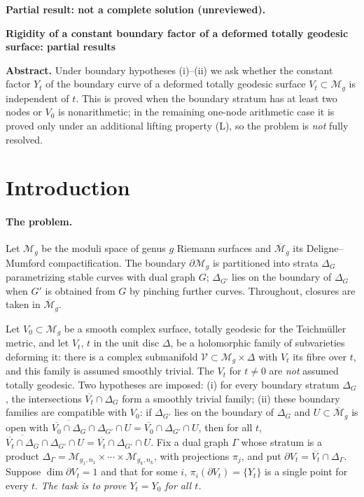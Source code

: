 \documentclass[12pt]{article}
\newcommand{\M}{\mathcal M}
\newcommand{\cl}[1]{\overline{#1}}
\theoremstyle{remark}
\begin{document}
\noindent\textbf{Partial result: not a complete solution (unreviewed).}\par

\begin{center}
\textbf{Rigidity of a constant boundary factor of a deformed
totally geodesic surface: partial results}
\end{center}

\noindent\textbf{Abstract.}
Under boundary hypotheses (i)--(ii) we ask whether the constant
factor \(Y_t\) of the boundary curve of a deformed totally geodesic
surface \(V_t\subset\M_g\) is independent of \(t\). This is proved
when the boundary stratum has at least two nodes or \(V_0\) is
nonarithmetic; in the remaining one-node arithmetic case
it is proved only under an additional lifting property (L), so the
problem is \emph{not} fully resolved.

\section{Introduction}

\paragraph{The problem.}
Let \(\M_g\) be the moduli space of genus \(g\) Riemann surfaces and
\(\cl{\M}_g\) its Deligne--Mumford compactification. The boundary
\(\partial\M_g\) is partitioned into strata \(\Delta_G\) parametrizing
stable curves with dual graph \(G\); \(\Delta_{G'}\) lies
on the boundary of \(\Delta_G\) when \(G'\) is obtained from \(G\) by
pinching further curves. Throughout, closures are taken in \(\cl{\M}_g\).

Let \(V_0\subset\M_g\) be a smooth complex surface, totally geodesic
for the Teichm\"uller metric, and let \(V_t\), \(t\) in the unit disc
\(\Delta\), be a holomorphic family of subvarieties deforming it:
there is a complex submanifold \(\mathcal V\subset\M_g\times\Delta\)
with \(V_t\) its fibre over \(t\), and this family is assumed smoothly
trivial. The \(V_t\) for \(t\ne0\) are \emph{not} assumed totally
geodesic. Two hypotheses are imposed:
(i) for every boundary stratum \(\Delta_G\), the intersections
\(\cl{V_t}\cap\Delta_G\) form a smoothly trivial family;
(ii) these boundary families are compatible with \(V_0\): if
\(\Delta_{G'}\) lies on the boundary of \(\Delta_G\) and
\(U\subset\cl{\M}_g\) is open with
\(\cl{\cl{V_0}\cap\Delta_G}\cap\Delta_{G'}\cap U
   =\cl{V_0}\cap\Delta_{G'}\cap U\),
then for all \(t\),
\(\cl{\cl{V_t}\cap\Delta_G}\cap\Delta_{G'}\cap U
   =\cl{V_t}\cap\Delta_{G'}\cap U\).
Fix a dual graph \(\Gamma\) whose stratum is a product
\(\Delta_\Gamma=\M_{g_1,n_1}\times\cdots\times\M_{g_k,n_k}\), with
projections \(\pi_j\), and put \(\partial V_t=\cl{V_t}\cap\Delta_\Gamma\).
Suppose \(\dim\partial V_t=1\) and that for some \(i\),
\(\pi_i(\partial V_t)=\{Y_t\}\) is a single point for every \(t\).
\emph{The task is to prove \(Y_t=Y_0\) for all \(t\).}
\end{document}
